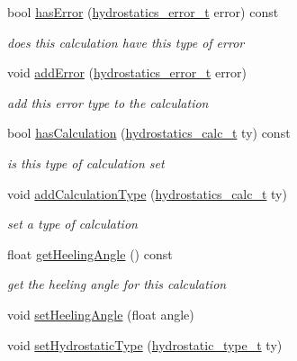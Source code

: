 \begin{DoxyCompactItemize}
\item 
bool \hyperlink{classShipCAD_1_1HydrostaticCalc_a8ae6f41fd9799cb17a855a9b4f89c5fb}{has\+Error} (\hyperlink{namespaceShipCAD_a1d801b982c24bce0cf10ffd4b995dda0}{hydrostatics\+\_\+error\+\_\+t} error) const 
\begin{DoxyCompactList}\small\item\em does this calculation have this type of error \end{DoxyCompactList}\item 
void \hyperlink{classShipCAD_1_1HydrostaticCalc_ad6415cb7c8e13ded4537292dd3a06688}{add\+Error} (\hyperlink{namespaceShipCAD_a1d801b982c24bce0cf10ffd4b995dda0}{hydrostatics\+\_\+error\+\_\+t} error)
\begin{DoxyCompactList}\small\item\em add this error type to the calculation \end{DoxyCompactList}\item 
bool \hyperlink{classShipCAD_1_1HydrostaticCalc_adb8e8e29d28e2da0e75e30c0636f034b}{has\+Calculation} (\hyperlink{namespaceShipCAD_ac9ff7fc96a52fceafa83edc0d5d06fce}{hydrostatics\+\_\+calc\+\_\+t} ty) const 
\begin{DoxyCompactList}\small\item\em is this type of calculation set \end{DoxyCompactList}\item 
void \hyperlink{classShipCAD_1_1HydrostaticCalc_a32379831790fd88d422c6783b1b70ef7}{add\+Calculation\+Type} (\hyperlink{namespaceShipCAD_ac9ff7fc96a52fceafa83edc0d5d06fce}{hydrostatics\+\_\+calc\+\_\+t} ty)
\begin{DoxyCompactList}\small\item\em set a type of calculation \end{DoxyCompactList}\item 
float \hyperlink{classShipCAD_1_1HydrostaticCalc_a7b27fef68486f663fd325ef316032a03}{get\+Heeling\+Angle} () const 
\begin{DoxyCompactList}\small\item\em get the heeling angle for this calculation \end{DoxyCompactList}\item 
void \hyperlink{classShipCAD_1_1HydrostaticCalc_ae6bf118e2e5e89a8e8d7ea7675fdee22}{set\+Heeling\+Angle} (float angle)
\item 
void \hyperlink{classShipCAD_1_1HydrostaticCalc_a61df8d7421f2900cbc18a6565963c66e}{set\+Hydrostatic\+Type} (\hyperlink{namespaceShipCAD_afea51c7ee52940acebde29bf44206fe2}{hydrostatic\+\_\+type\+\_\+t} ty)

\end{DoxyCompactItemize}
